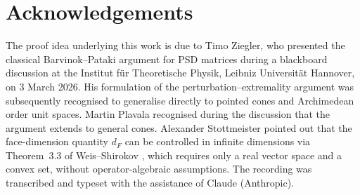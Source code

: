 \documentclass[11pt,a4paper]{article}
\theoremstyle{definition}
\begin{document}
\section*{Acknowledgements}

The proof idea underlying this work is due to Timo Ziegler, who
presented the classical Barvinok--Pataki argument for PSD matrices
during a blackboard discussion at the Institut f\"ur Theoretische
Physik, Leibniz Universit\"at Hannover, on 3 March 2026.  His
formulation of the perturbation--extremality argument was
subsequently recognised to generalise directly to pointed cones
and Archimedean order unit spaces.  Martin Plavala recognised during the discussion that the
argument extends to general cones.  Alexander Stottmeister
pointed out that the face-dimension quantity $d_F$ can be controlled
in infinite dimensions via Theorem~3.3 of Weis--Shirokov
\cite{weis_shirokov21}, which requires only a real vector space and
a convex set, without operator-algebraic assumptions.  The recording
was transcribed and typeset with the assistance of Claude (Anthropic).
\end{document}
